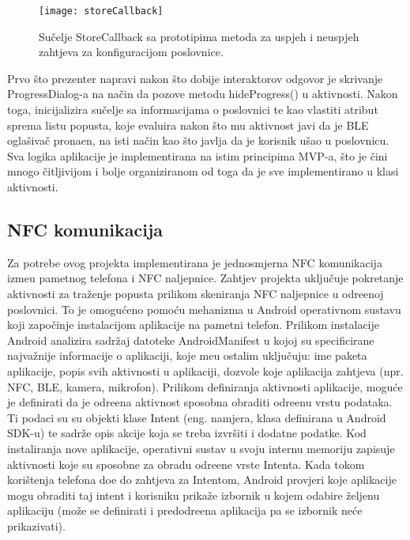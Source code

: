 \begin{figure}[!htbp]
	\begin{center}
 \texttt{[image: storeCallback]}
 \caption{Su\v{c}elje StoreCallback sa prototipima metoda za uspjeh i neuspjeh zahtjeva za konfiguracijom poslovnice.}
 \label{fig:storeCallback}
	\end{center}
\end{figure}

Prvo \v{s}to prezenter napravi nakon \v{s}to dobije interaktorov odgovor je skrivanje ProgressDialog-a na na\v{c}in da pozove metodu hideProgress() u aktivnosti. Nakon toga, inicijalizira su\v{c}elje sa informacijama o poslovnici te kao vlastiti atribut sprema listu popusta, koje evaluira nakon \v{s}to mu aktivnost javi da je BLE ogla\v{s}iva\v{c} prona\dj en, na isti na\v{c}in kao \v{s}to javlja da je korisnik u\v{s}ao u poslovnicu. Sva logika aplikacije je implementirana na istim principima MVP-a, \v{s}to je \v{c}ini mnogo \v{c}itljivijom i bolje organiziranom od toga da je sve implementirano u klasi aktivnosti.

\subsection{NFC komunikacija}

Za potrebe ovog projekta implementirana je jednosmjerna NFC komunikacija izme\dj u pametnog telefona i NFC naljepnice. Zahtjev projekta uklju\v{c}uje pokretanje aktivnosti za tra\v{z}enje popusta prilikom skeniranja NFC naljepnice u odre\dj enoj poslovnici. To je omogu\'{c}eno pomo\'{c}u mehanizma u Android operativnom sustavu koji zapo\v{c}inje instalacijom aplikacije na pametni telefon. Prilikom instalacije Android analizira sadr\v{z}aj datoteke AndroidManifest \cite{androidManifest} u kojoj su specificirane najva\v{z}nije informacije o aplikaciji, koje me\dj u ostalim uklju\v{c}uju: ime paketa aplikacije, popis svih aktivnosti u aplikaciji, dozvole koje aplikacija zahtjeva (npr. NFC, BLE, kamera, mikrofon). Prilikom definiranja aktivnosti aplikacije, mogu\'{c}e je definirati da je odre\dj ena aktivnost sposobna obraditi odre\dj enu vrstu podataka. Ti podaci su su objekti klase Intent (eng. namjera, klasa definirana u Android SDK-u) te sadr\v{z}e opis akcije koja se treba izvr\v{s}iti i dodatne podatke. Kod instaliranja nove aplikacije, operativni sustav u svoju internu memoriju zapisuje aktivnosti koje su sposobne za obradu odre\dj ene vrste Intenta. Kada tokom kori\v{s}tenja telefona do\dj e do zahtjeva za Intentom, Android provjeri koje aplikacije mogu obraditi taj intent i korisniku prika\v{z}e izbornik u kojem odabire \v{z}eljenu aplikaciju (mo\v{z}e se definirati i predodre\dj ena aplikacija pa se izbornik ne\'{c}e prikazivati).

